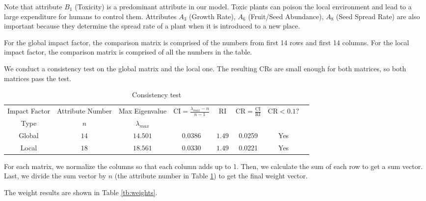 \documentclass[12pt]{article}
\begin{document}
		Note that attribute $B_1$ (Toxicity) is a predominant attribute in our model.  Toxic plants can poison the local environment and lead to a large expenditure for humans to control them.  Attributes $A_3$ (Growth Rate), $A_6$ (Fruit/Seed Abundance), $A_8$ (Seed Spread Rate) are also important because they  determine the spread rate of a plant when it is introduced to a new place.
		
		For the global impact factor, the comparison matrix is comprised of the numbers from first 14 rows and first 14 columns.  For the local impact factor, the comparison matrix is comprised of all the numbers in the table.  
		
		We conduct a consistency test on the global matrix and the local one.  The resulting CRs are small enough for both matrices, so both matrices pass the test.
		
		{
			\fontsize{10}{14}\selectfont
			{
				\begin{longtable}{cccccccc}
					\caption{Consistency test}
					\label{tb:consistency}\\
					
					\toprule
					Impact Factor&Attribute Number&Max Eigenvalue 
					&\multirow{2}{*}{$\mathrm{CI}=\displaystyle \frac{\lambda_{max}-n}{n-1}$}
					&\multirow{2}{*}{$\mathrm{RI}$}
					&\multirow{2}{*}{$\mathrm{CR}=\displaystyle \frac{\mathrm{CI}}{\mathrm{RI}}$}
					&\multirow{2}{*}{$\mathrm{CR}<0.1?$}\\
					Type&$n$&$\lambda_{max}$\\
					\toprule
					Global&$14$&$14.501$&$0.0386$&$1.49$&0.0259&Yes\\
					Local&$18$&$18.561$&$0.0330$&$1.49$&0.0221&Yes\\
					\bottomrule
				\end{longtable}
			}
		}	
		
		For each matrix, we normalize the columns so that each column adds up to 1.  Then, we calculate the sum of each row to get a sum vector.  Last, we divide the sum vector by $n$ (the attribute number in Table \ref{tb:consistency}) to get the final weight vector.  
		
		The weight results are shown in Table \ref{tb:weights}.
	
\end{document}

